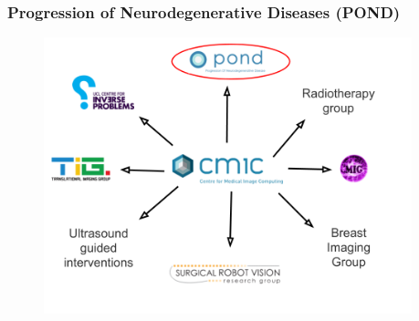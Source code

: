 \documentclass[8pt,xcolor=table]{beamer}
\begin{document}
\begin{frame}
\frametitle{Progression of Neurodegenerative Diseases (POND)}

\begin{figure}
\centering
\includegraphics[height=8cm]{pond_diagram} 
\end{figure}



\end{frame}
\end{document}
